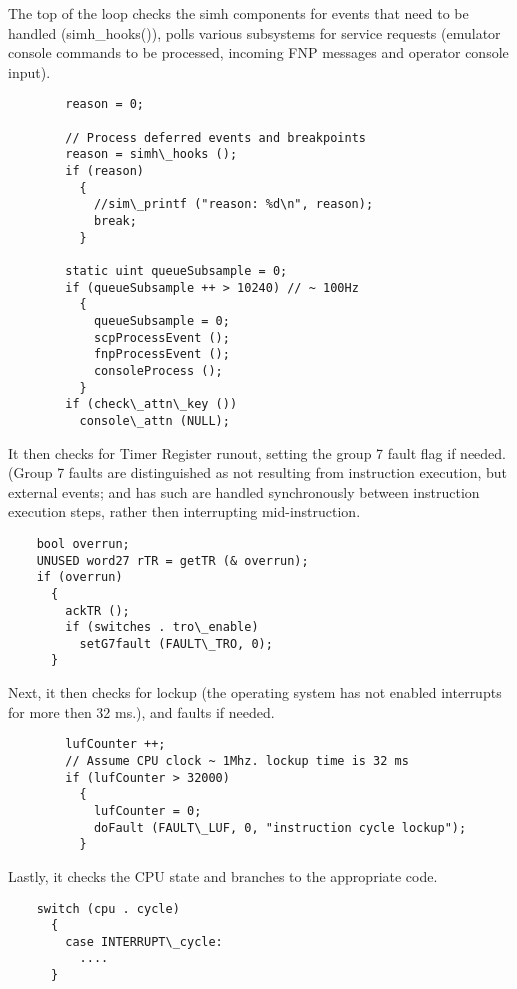 \documentclass[notitlepage]{report}
\begin{document}
The top of the loop checks the simh components for events that need
to be handled (simh\_hooks()), polls various subsystems for service requests
(emulator console commands to be processed, incoming FNP messages and 
operator console input).

\begin{verbatim}
        reason = 0;

        // Process deferred events and breakpoints
        reason = simh\_hooks ();
        if (reason)
          {
            //sim\_printf ("reason: %d\n", reason);
            break;
          }

        static uint queueSubsample = 0;
        if (queueSubsample ++ > 10240) // ~ 100Hz
          {
            queueSubsample = 0;
            scpProcessEvent ();
            fnpProcessEvent ();
            consoleProcess ();
          }
        if (check\_attn\_key ())
          console\_attn (NULL);
\end{verbatim}

It then checks for Timer Register runout, setting the group 7 fault flag
if needed. (Group 7 faults are distinguished as not resulting from
instruction execution, but external events; and has such are handled
synchronously between instruction execution steps, rather then 
interrupting mid-instruction. 

\begin{verbatim}
    bool overrun;
    UNUSED word27 rTR = getTR (& overrun);
    if (overrun)
      {
        ackTR ();
        if (switches . tro\_enable)
          setG7fault (FAULT\_TRO, 0);
      }
\end{verbatim}

Next, it then checks for lockup (the operating system has not enabled 
interrupts for more then 32 ms.), and faults if needed.

\begin{verbatim}
        lufCounter ++;
        // Assume CPU clock ~ 1Mhz. lockup time is 32 ms
        if (lufCounter > 32000)
          {
            lufCounter = 0;
            doFault (FAULT\_LUF, 0, "instruction cycle lockup");
          }
\end{verbatim}

Lastly, it checks the CPU state and branches to the appropriate code.

\begin{verbatim}
    switch (cpu . cycle)
      {
        case INTERRUPT\_cycle:
          ....
      }
\end{verbatim}
\end{document}
